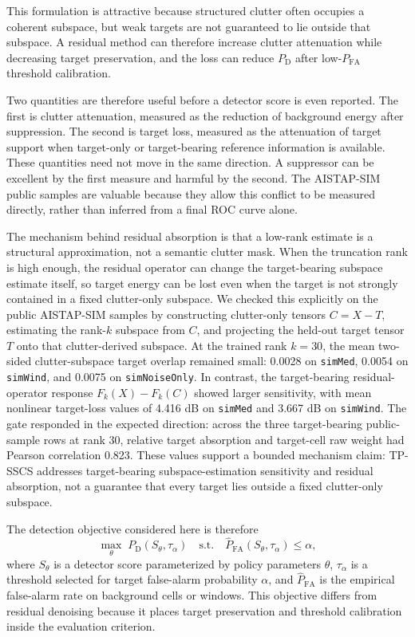 \documentclass[journal]{IEEEtran}
\begin{document}
This formulation is attractive because structured clutter often occupies a coherent subspace, but weak targets are not guaranteed to lie outside that subspace. A residual method can therefore increase clutter attenuation while decreasing target preservation, and the loss can reduce $P_{\mathrm{D}}$ after low-$P_{\mathrm{FA}}$ threshold calibration.

Two quantities are therefore useful before a detector score is even reported. The first is clutter attenuation, measured as the reduction of background energy after suppression. The second is target loss, measured as the attenuation of target support when target-only or target-bearing reference information is available. These quantities need not move in the same direction. A suppressor can be excellent by the first measure and harmful by the second. The AISTAP-SIM public samples are valuable because they allow this conflict to be measured directly, rather than inferred from a final ROC curve alone.

The mechanism behind residual absorption is that a low-rank estimate is a structural approximation, not a semantic clutter mask. When the truncation rank is high enough, the residual operator can change the target-bearing subspace estimate itself, so target energy can be lost even when the target is not strongly contained in a fixed clutter-only subspace. We checked this explicitly on the public AISTAP-SIM samples by constructing clutter-only tensors $C=X-T$, estimating the rank-$k$ subspace from $C$, and projecting the held-out target tensor $T$ onto that clutter-derived subspace. At the trained rank $k=30$, the mean two-sided clutter-subspace target overlap remained small: 0.0028 on \texttt{simMed}, 0.0054 on \texttt{simWind}, and 0.0075 on \texttt{simNoiseOnly}. In contrast, the target-bearing residual-operator response $F_k(X)-F_k(C)$ showed larger sensitivity, with mean nonlinear target-loss values of 4.416 dB on \texttt{simMed} and 3.667 dB on \texttt{simWind}. The gate responded in the expected direction: across the three target-bearing public-sample rows at rank 30, relative target absorption and target-cell raw weight had Pearson correlation 0.823. These values support a bounded mechanism claim: TP-SSCS addresses target-bearing subspace-estimation sensitivity and residual absorption, not a guarantee that every target lies outside a fixed clutter-only subspace.

The detection objective considered here is therefore
\begin{equation}
    \max_{\theta} \; P_{\mathrm{D}}(S_\theta, \tau_\alpha)
    \quad \mathrm{s.t.} \quad
    \widehat{P}_{\mathrm{FA}}(S_\theta, \tau_\alpha) \leq \alpha ,
\end{equation}
where $S_\theta$ is a detector score parameterized by policy parameters $\theta$, $\tau_\alpha$ is a threshold selected for target false-alarm probability $\alpha$, and $\widehat{P}_{\mathrm{FA}}$ is the empirical false-alarm rate on background cells or windows. This objective differs from residual denoising because it places target preservation and threshold calibration inside the evaluation criterion.
\end{document}
